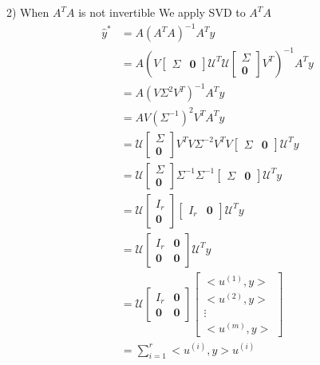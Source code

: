 2) When $A^TA$ is not invertible
We apply SVD to $A^T A$
\begin{align*}
\hat{y}^* &= A(A^TA)^{-1}A^Ty\\
&= A(V
\begin{bmatrix}
\Sigma & \textbf{0}
\end{bmatrix}
\mathcal{U}^T\mathcal{U}
\begin{bmatrix}
\Sigma \\
\textbf{0}
\end{bmatrix}
V^T)^{-1}A^Ty\\
&= A(V\Sigma^2V^T)^{-1}A^Ty\\
&= AV(\Sigma^{-1})^2V^TA^Ty\\
&= \mathcal{U}
\begin{bmatrix}
\Sigma \\
\textbf{0}
\end{bmatrix}
V^TV\Sigma^{-2}V^TV
\begin{bmatrix}
\Sigma & \textbf{0}
\end{bmatrix}
\mathcal{U}^Ty\\
&= \mathcal{U}
\begin{bmatrix}
\Sigma \\
\textbf{0}
\end{bmatrix}
\Sigma^{-1}\Sigma^{-1}
\begin{bmatrix}
\Sigma & \textbf{0}
\end{bmatrix}
\mathcal{U}^Ty\\
&= \mathcal{U}
\begin{bmatrix}
I_r\\
\textbf{0}
\end{bmatrix}
\begin{bmatrix}
I_r & \textbf{0}
\end{bmatrix}
\mathcal{U}^Ty\\
&= \mathcal{U}
\begin{bmatrix}
I_r& \textbf{0}\\
\textbf{0} & \textbf{0}
\end{bmatrix}
\mathcal{U}^Ty\\
&= \mathcal{U}
\begin{bmatrix}
I_r& \textbf{0}\\
\textbf{0} &  \textbf{0}
\end{bmatrix}
\begin{bmatrix}
<u^{(1)}, y>\\
<u^{(2)}, y>\\
\vdots\\
<u^{(m)}, y>
\end{bmatrix}\\
&= \sum^r_{i=1}<u^{(i)}, y>u^{(i)}
\end{align*}



